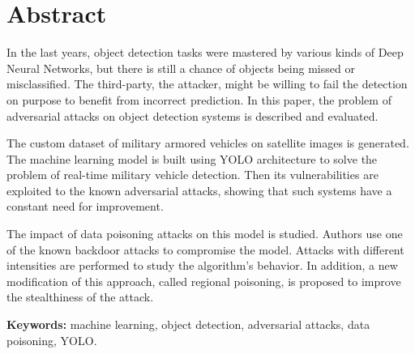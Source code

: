\documentclass[14pt,a4paper]{extarticle}
\newcounter{e}
\newcounter{tabl}
\numberwithin{equation}{section}
\numberwithin{figure}{section}
\begin{document}
	

\thispagestyle{empty}
\newlength{\originalVOffset}
\newlength{\originalHOffset}
\setlength{\originalVOffset}{\voffset}   
\setlength{\originalHOffset}{\hoffset}
\setlength{\voffset}{0cm}
\setlength{\hoffset}{0cm}

\setlength{\voffset}{\originalVOffset}
\setlength{\hoffset}{\originalHOffset}






 \newpage
 \thispagestyle{empty}
 \renewcommand*\contentsname{Contents}
 \tableofcontents

\newpage
\thispagestyle{empty}
\section*{Abstract}
\begin{center}\end{center}
In the last years, object detection tasks were mastered by various kinds of Deep Neural Networks, but there is still a chance of objects being missed or misclassified. The third-party, the attacker, might be willing to fail the detection on purpose to benefit from incorrect prediction.
In this paper, the problem of adversarial attacks on object detection systems is described and evaluated.

The custom dataset of military armored vehicles on satellite images is generated. The machine learning model is built using YOLO architecture to solve the problem of real-time military vehicle detection. Then its vulnerabilities are exploited to the known adversarial attacks, showing that such systems have a constant need for improvement.

The impact of data poisoning attacks on this model is studied. Authors use one of the known backdoor attacks to compromise the model. Attacks with different intensities are performed to study the algorithm's behavior. In addition, a new modification of this approach, called regional poisoning, is proposed to improve the stealthiness of the attack.



\textbf{Keywords:} machine learning, object detection, adversarial attacks, data poisoning, YOLO.

\end{document}
